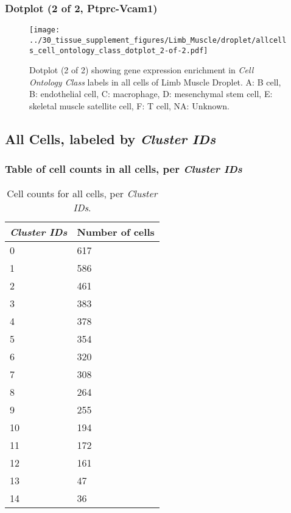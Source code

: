 \clearpage

\subsubsection{Dotplot (2 of 2, Ptprc-Vcam1)}
\begin{figure}[h]
\centering
\texttt{[image: ../30\_tissue\_supplement\_figures/Limb\_Muscle/droplet/allcells\_cell\_ontology\_class\_dotplot\_2-of-2.pdf]}

\caption{ Dotplot (2 of 2)  showing gene expression enrichment in \emph{Cell Ontology Class} labels in all cells of Limb Muscle Droplet. A: B cell, B: endothelial cell, C: macrophage, D: mesenchymal stem cell, E: skeletal muscle satellite cell, F: T cell, NA: Unknown.}
\end{figure}


\clearpage

\subsection{All Cells, labeled by \emph{Cluster IDs}}
\subsubsection{Table of cell counts in all cells, per \emph{Cluster IDs}}\begin{table}[h]
\centering
\label{my-label}
\begin{tabular}{@{}ll@{}}
\toprule

\emph{Cluster IDs}& Number of cells \\ \midrule
0 & 617 \\

1 & 586 \\

2 & 461 \\

3 & 383 \\

4 & 378 \\

5 & 354 \\

6 & 320 \\

7 & 308 \\

8 & 264 \\

9 & 255 \\

10 & 194 \\

11 & 172 \\

12 & 161 \\

13 & 47 \\

14 & 36 \\
\bottomrule
\end{tabular}
\caption{Cell counts for all cells, per \emph{Cluster IDs}.}
\end{table}

